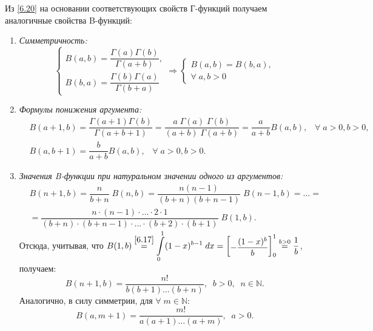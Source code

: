 \begin{note}
    Из \eqref{6.20} на основании соответствующих свойств Г-функций получаем аналогичные свойства B-функций:
    \begin{enumerate}
        \item \textit{Симметричность:}
        \begin{equation}
            \label{6.21}
            \begin{cases}
                B(a, b) = \dfrac{\Gamma(a) \Gamma(b)}{\Gamma(a+b)}, \\
                B(b, a) = \dfrac{\Gamma(b) \Gamma(a)}{\Gamma(b+a)}
            \end{cases}
            \Rightarrow
            \begin{cases}
                B(a, b) = B(b, a), \\
                \forall \; a, b > 0
            \end{cases}
        \end{equation}

        \item \textit{Формулы понижения аргумента:}
        \begin{align*}
            & B(a+1, b) = \dfrac{\Gamma(a+1) \Gamma(b)}{\Gamma(a+b+1)} =
            \dfrac{a \; \Gamma(a) \; \Gamma(b)}{(a+b) \; \Gamma(a+b)} =
            \dfrac{a}{a+b} B(a, b), \;\;\; \forall \; a > 0, b > 0,
            \\ &
            B(a, b+1) = \dfrac{b}{a+b} B(a, b),  \;\;\; \forall \; a > 0, b > 0.
        \end{align*}

        \item \textit{Значения B-функции при натуральном значении одного из аргументов:}
        \begin{align*}
            &
            B(n+1, b) = \dfrac{n}{b+n} \; B(n, b) = \dfrac{n(n-1)}{(b+n)(b+n-1)} \; B(n-1, b)   = \ldots =
            \\ &
            = \dfrac{n \cdot (n-1) \cdot \ldots  \cdot 2  \cdot 1 }{(b+n) \cdot (b+n-1) \cdot \ldots \cdot (b+2) \cdot (b+1)} \; B(1, b).
        \end{align*}
        Отсюда, учитывая, что $ B(1, b) \overset{\eqref{6.17}}{=} \displaystyle\int\limits_0^1 (1-x)^{b-1} \; dx = \left[\begin{matrix}- \dfrac{(1-x)^b}{b}\end{matrix}\right]_0^1  \overset{b>0}{=} \dfrac{1}{b}$, получаем:
        \begin{equation}
            \label{6.22}
            B(n+1, b) = \dfrac{n!}{b(b+1) \ldots (b+n)} , \;\; b > 0, \;\; n \in \mathbb{N}.
        \end{equation}
        Аналогично, в силу симметрии, для $ \forall \; m \in \mathbb{N} $:
        \begin{equation}
            \label{6.23}
            B(a, m+1) = \dfrac{m!}{a(a+1) \ldots (a+m)} , \;\; a > 0.
        \end{equation}


\end{enumerate}
\end{note}
